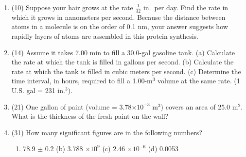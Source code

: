 \documentclass[12pt]{article}
\begin{document}
\begin{enumerate}
\item (10) Suppose your hair grows at the rate $\frac{1}{32}$ in.\ per day.
Find the rate in which it grows in nanometers per second.  Because the distance
between atoms in a molecule is on the order of 0.1 nm, your answer suggests 
how rapidly layers of atoms are assembled in this protein synthesis.

\item (14) Assume it takes 7.00 min to fill a 30.0-gal gasoline tank.
(a) Calculate the rate at which the tank is filled in gallons per second.
(b) Calculate the rate at which the tank is filled in cubic meters per
second.  (c) Determine the time interval, in hours, required to fill a
1.00-m$^3$ volume at the same rate.  (1 U.S. gal = 231 in.$^3$).

\item (21) One gallon of paint (volume = 3.78$\times 10^{-3}$ m$^{3}$)
covers an area of 25.0 m$^2$.  What is the thickness of the fresh
paint on the wall?




\item (31) How many significant figures are in the following numbers?
\begin{enumerate}
\item 78.9 $\pm$ 0.2 \qquad (b) 3.788 $\times 10^9$ 
\qquad (c) 2.46 $\times 10^{-6}$ 
\qquad (d) 0.0053
\end{enumerate}
\end{enumerate}

\end{document}
